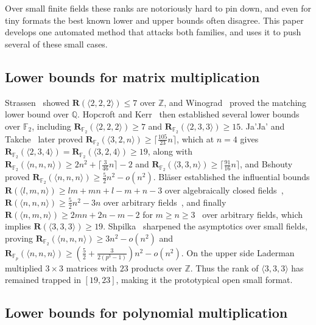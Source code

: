 \documentclass[11pt]{article}
\theoremstyle{definition}
\newcommand{\F}{\mathbb{F}}
\newcommand{\R}{\mathbf{R}}
\newcommand{\Rk}[2]{\mathbf{R}_{#1}(#2)}
\newcommand{\mmt}[3]{\langle #1,#2,#3\rangle}
\begin{document}
Over small finite fields these ranks are notoriously hard to pin down, and even
for tiny formats the best known lower and upper bounds often disagree. This paper
develops one automated method that attacks both families, and uses it to push
several of these small cases.

\subsection{Lower bounds for matrix multiplication}

Strassen~\cite{strassen1969gaussian} showed $\R(\mmt{2}{2}{2})\le 7$ over $\mathbb{Z}$, and
Winograd~\cite{winograd1971multiplication} proved the matching lower bound over $\mathbb{Q}$.
Hopcroft and Kerr~\cite{hopcroft1971minimizing} then established several lower
bounds over $\F_2$, including $\Rk{\F_2}{\mmt{2}{2}{2}}\ge 7$ and
$\Rk{\F_2}{\mmt{2}{3}{3}}\ge 15$.
Ja'Ja' and Takche~\cite{ja1985improved} later proved
$\Rk{\F_2}{\mmt{3}{2}{n}}\ge\lceil\tfrac{105}{23}n\rceil$, which at $n=4$ gives
$\Rk{\F_2}{\mmt{2}{3}{4}}=\Rk{\F_2}{\mmt{3}{2}{4}}\ge 19$, along with
$\Rk{\F_2}{\mmt{n}{n}{n}}\ge 2n^2+\lceil\tfrac{3}{46}n\rceil-2$ and
$\Rk{\F_2}{\mmt{3}{3}{n}}\ge\lceil\tfrac{91}{16}n\rceil$, and
Bshouty~\cite{bshouty1989lower} proved $\Rk{\F_2}{\mmt{n}{n}{n}}\ge \tfrac{5}{2}n^2-o(n^2)$.
Bl\"aser established the influential bounds
$\R(\mmt{l}{m}{n})\ge lm+mn+l-m+n-3$ over algebraically closed
fields~\cite{blaser1999lower}, $\R(\mmt{n}{n}{n})\ge \tfrac{5}{2}n^2-3n$ over
arbitrary fields~\cite{blaser1999fivehalf}, and finally
$\R(\mmt{n}{m}{n})\ge 2mn+2n-m-2$ for $m\ge n\ge 3$~\cite{blaser2003complexity} over arbitrary fields,
which implies $\R(\mmt{3}{3}{3})\ge 19$.
Shpilka~\cite{shpilka2001lower} sharpened the asymptotics over small fields, proving
$\Rk{\F_2}{\mmt{n}{n}{n}}\ge 3n^2-o(n^2)$ and
$\Rk{\F_p}{\mmt{n}{n}{n}}\ge(\tfrac{5}{2}+\tfrac{3}{2(p^3-1)})n^2-o(n^2)$.
On the upper side
Laderman~\cite{laderman1976noncommutative} multiplied $3\times 3$ matrices with
$23$ products over $\mathbb{Z}$. Thus the rank of $\mmt{3}{3}{3}$ has remained trapped in $[19,23]$,
making it the prototypical open small format.

\subsection{Lower bounds for polynomial multiplication}
\end{document}
